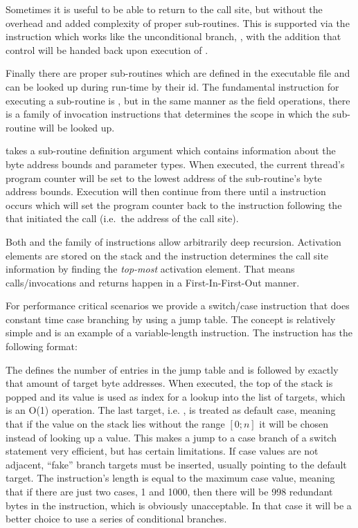 Sometimes it is useful to be able to return to the call site, but without the
overhead and added complexity of proper sub-routines. This is supported via the
 instruction which works like the unconditional branch, ,
with the addition that control will be handed back upon execution of
.

Finally there are proper sub-routines which are defined in the executable file
and can be looked up during run-time by their id. The fundamental instruction
for executing a sub-routine is , but in the same manner as the
field operations, there is a family of invocation instructions that determines
the scope in which the sub-routine will be looked up.

 takes a sub-routine definition argument which contains
information about the byte address bounds and parameter types. When executed,
the current thread's program counter will be set to the lowest address of the
sub-routine's byte address bounds. Execution will then continue from there until
a  instruction occurs which will set the program counter back to
the instruction following the  that initiated the call (i.e.~the
address of the call site).

Both  and the  family of instructions allow
arbitrarily deep recursion. Activation elements are stored on the stack and the
 instruction determines the call site information by finding the
\emph{top-most} activation element. That means calls/invocations and returns
happen in a First-In-First-Out manner.

For performance critical scenarios we provide a switch/case instruction that
does constant time case branching by using a jump table. The concept is
relatively simple and is an example of a variable-length instruction. The
 instruction has the following format:


The  defines the number of entries in the jump table and is
followed by exactly that amount of target byte addresses. When executed, the top
of the stack is popped and its value is used as index for a lookup into the list
of targets, which is an O(1) operation. The last target, i.e. ,
is treated as default case, meaning that if the value on the stack lies without
the range $[0;n]$ it will be chosen instead of looking up a value. This makes a
jump to a case branch of a switch statement very efficient, but has certain
limitations. If case values are not adjacent, ``fake'' branch targets must be
inserted, usually pointing to the default target. The instruction's length is
equal to the maximum case value, meaning that if there are just two cases, 1 and
1000, then there will be 998 redundant bytes in the instruction, which is
obviously unacceptable. In that case it will be a better choice to use a series
of conditional branches.

